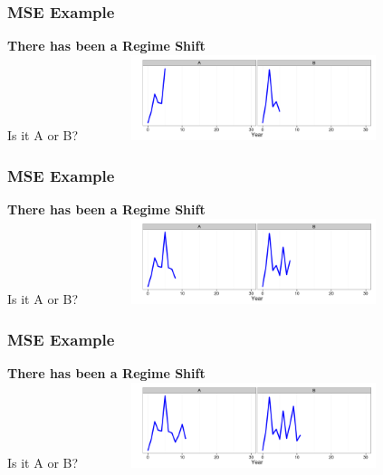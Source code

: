 \begin{frame}\frametitle{MSE Example} \smallskip\textbf{There has been a {\color{blue} Regime Shift}}\smallskip\\ Is it A or B? \includegraphics[height=25mm,width=100mm]{doug1.png}\end{frame}
\begin{frame}\frametitle{MSE Example} \smallskip\textbf{There has been a {\color{blue} Regime Shift}}\smallskip\\ Is it A or B? \includegraphics[height=25mm,width=100mm]{doug4.png}\end{frame}
\begin{frame}\frametitle{MSE Example} \smallskip\textbf{There has been a {\color{blue} Regime Shift}}\smallskip\\ Is it A or B? \includegraphics[height=25mm,width=100mm]{doug7.png}\end{frame}
